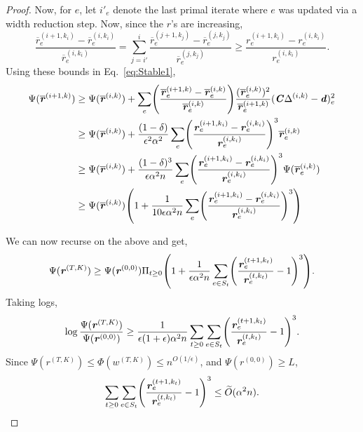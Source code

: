 \documentclass[11pt]{article}
\let\originalleft\left
\let\originalright\right
\renewcommand{\left}{\mathopen{}\mathclose\bgroup\originalleft}
\renewcommand{\right}{\aftergroup\egroup\originalright}
\newcommand\dd{\boldsymbol{\mathit{d}}}
\newcommand\rr{\boldsymbol{\mathit{r}}}
\newcommand\ww{\boldsymbol{\mathit{w}}}
\newcommand\rrbar{\overline{\boldsymbol{\mathit{r}}}}
\newcommand\CC{\boldsymbol{\mathit{C}}}
\newcommand\Otil{\widetilde{O}}
\begin{document}
\begin{proof}
Now, for $e$, let $i'_e$ denote the last primal iterate where $e$ was updated via a width reduction step. Now, since the $\rr$'s are increasing,
\[
\frac{\rrbar_e^{(i+1,k_i)}-\rrbar^{(i,k_i)}_e}{\rrbar^{(i,k_i)}_e}=\sum_{j=i'}^i\frac{\rrbar_e^{(j+1,k_j)}-\rrbar^{(j,k_j)}_e}{\rrbar^{(j,k_j)}_e}\geq \frac{\rr_e^{(i+1,k_i)}-\rr^{(i,k_i)}_e}{\rr^{(i,k_i)}_e}.
\]
Using these bounds in Eq.~\eqref{eq:Stable1},
\begin{align*}
  \Psi(\rrbar^{(i+1,k)}) & \geq  \Psi(\rrbar^{(i,k)})  + \sum_e \left(\frac{\rrbar_e^{\left(i + 1,k\right)}-\rrbar_e^{\left(i,k \right)}}{\rrbar_e^{\left(i,k \right)}} \right) \frac{(\rrbar_e^{(i,k)})^2}{\rrbar^{(i+1,k)}_e} (\CC\Delta^{(i,k)}-\dd)_e^2\\
  & \geq \Psi(\rrbar^{(i,k)}) + \frac{(1-\delta)}{\epsilon^2\alpha^2}\sum_e \left(\frac{\rr_e^{(i+1,k_i)}-\rr^{(i,k_i)}_e}{\rr^{(i,k_i)}_e}\right)^3\rrbar_e^{(i,k)}\\
  & \geq \Psi(\rrbar^{(i,k)}) + \frac{(1-\delta)^3}{\epsilon\alpha^2 n}\sum_e \left(\frac{\rr_e^{(i+1,k_i)}-\rr^{(i,k_i)}_e}{\rr^{(i,k_i)}_e}\right)^3\Psi(\rrbar_e^{(i,k)})\\
  & \geq \Psi(\rrbar^{(i,k)})\left(1 + \frac{1}{10\epsilon\alpha^2 n}\sum_e \left(\frac{\rr_e^{(i+1,k_i)}-\rr^{(i,k_i)}_e}{\rr^{(i,k_i)}_e}\right)^3\right)
\end{align*}




We can now recurse on the above and get,
\begin{equation}\label{eq:Stable4}
  \Psi(\rr^{(T,K)}) \geq \Psi(\rr^{(0,0)})\Pi_{t\geq 0}\left(1 + \frac{1}{\epsilon\alpha^2n} \sum_{e\in S_t}\left(\frac{\rr^{(t+1,k_t)}_e}{\rr^{(t,k_t)}_e} - 1\right)^3 \right).
\end{equation}
Taking logs,
\[
\log \frac{\Psi(\rr^{(T,K)})}{\Psi(\rr^{(0,0)})} \geq \frac{1}{\epsilon(1+\epsilon)\alpha^2n}\sum_{t\geq 0}\sum_{e\in S_t}\left(\frac{\rr^{(t+1,k_t)}_e}{\rr^{(t,k_t)}_e} - 1\right)^3 .
\]
Since $\Psi(\rr^{(T,K)}) \leq \Phi(\ww^{(T,K)})\leq n^{O(1/\epsilon)}$, and $\Psi(\rr^{(0,0)})\geq L$,
\[
\sum_{t\geq 0}\sum_{e\in S_t}\left(\frac{\rr^{(t+1,k_t)}_e}{\rr^{(t,k_t)}_e} - 1\right)^3  \leq \Otil(\alpha^2 n).
\]


\end{proof}

\MonotoneWidth*
\end{document}
